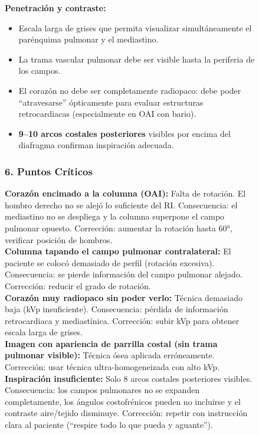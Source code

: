\begin{figure}
{\textbf{Penetración y contraste:}
\begin{itemize}
  \item Escala larga de grises que permita visualizar simultáneamente el parénquima pulmonar
        y el mediastino.
  \item La trama vascular pulmonar debe ser visible hasta la periferia de los campos.
  \item El corazón no debe ser completamente radiopaco: debe poder ``atravesarse''
        ópticamente para evaluar estructuras retrocar\-dia\-cas (especialmente en OAI con bario).
  \item \textbf{9--10 arcos costales posteriores} visibles por encima del diafragma confirman
        inspiración adecuada.
\end{itemize}

\subsubsection*{6. Puntos Críticos}

\textbf{Corazón encimado a la columna (OAI):} Falta de rotación. El hombro derecho no se alejó
lo suficiente del RI. Consecuencia: el mediastino no se despliega y la columna superpone el campo
pulmonar opuesto. Corrección: aumentar la rotación hasta 60°, verificar posición de hombros.\\

\textbf{Columna tapando el campo pulmonar contralateral:} El paciente se colocó demasiado de perfil
(rotación excesiva). Consecuencia: se pierde información del campo pulmonar alejado. Corrección:
reducir el grado de rotación.\\

\textbf{Corazón muy radiopaco sin poder verlo:} Técnica demasiado baja (kVp insuficiente).
Consecuencia: pérdida de información retrocardiaca y mediastínica. Corrección: subir kVp para
obtener escala larga de grises.\\

\textbf{Imagen con apariencia de parrilla costal (sin trama pulmonar visible):} Técnica ósea
aplicada erróneamente. Corrección: usar técnica ultra-homogeneizada con alto kVp.\\

\textbf{Inspiración insuficiente:} Solo 8 arcos costales posteriores visibles. Consecuencia:
los campos pulmonares no se expanden completamente, los ángulos costofrénicos pueden no incluirse
y el contraste aire/tejido disminuye. Corrección: repetir con instrucción clara al paciente
(``respire todo lo que pueda y aguante'').\\

}
\end{figure}
